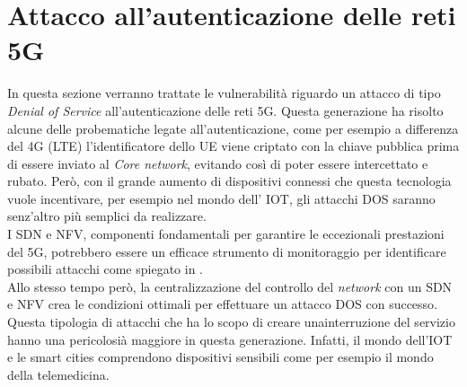 \chapter{Attacco all'autenticazione delle reti 5G}
In questa sezione verranno trattate le vulnerabilità riguardo un attacco di tipo \textit{Denial of Service} all'autenticazione delle reti 5G.
Questa generazione ha risolto alcune delle probematiche legate all'autenticazione, come per esempio a differenza del 4G (LTE) l'identificatore 
dello UE viene criptato con la chiave pubblica prima di essere inviato al \textit{Core network}, evitando così di poter essere intercettato e rubato\cite{5g-vs-4g}.
Però, con il grande aumento di dispositivi connessi che questa tecnologia vuole incentivare, per esempio nel mondo dell' IOT, gli attacchi DOS saranno senz'altro più 
semplici da realizzare.\\
I SDN e NFV, componenti fondamentali per garantire le eccezionali prestazioni del 5G, potrebbero essere un efficace strumento di monitoraggio per identificare possibili 
attacchi come spiegato in \cite{dos-detection-with-sdn}.\\
Allo stesso tempo però, la centralizzazione del controllo del \textit{network} con un SDN e NFV crea le condizioni ottimali per effettuare un attacco DOS con successo\cite{5g-dos}.\\
Questa tipologia di attacchi che ha lo scopo di creare unainterruzione del servizio hanno una pericolosià maggiore in questa generazione. Infatti, il mondo dell'IOT e le smart cities comprendono 
dispositivi sensibili come per esempio il mondo della telemedicina.

